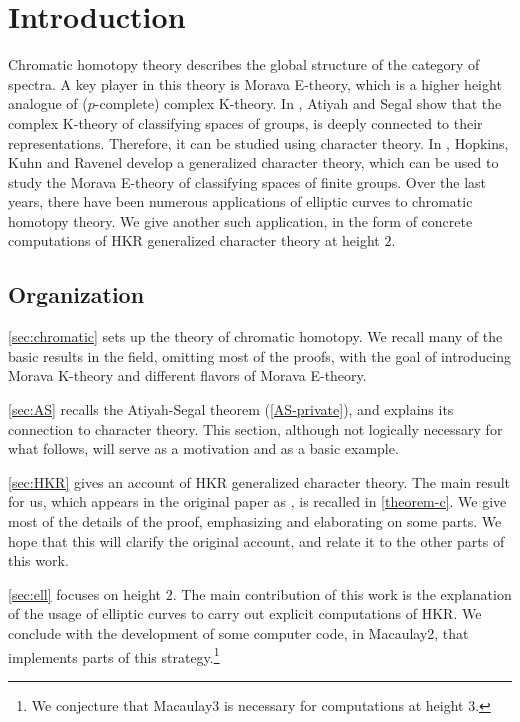 \section{Introduction}

Chromatic homotopy theory describes the global structure of the category of spectra.
A key player in this theory is Morava E-theory, which is a higher height analogue of ($p$-complete) complex K-theory.
In \cite{AS}, Atiyah and Segal show that the complex K-theory of classifying spaces of groups, is deeply connected to their representations. Therefore, it can be studied using character theory.
In \cite{HKR}, Hopkins, Kuhn and Ravenel develop a generalized character theory, which can be used to study the Morava E-theory of classifying spaces of finite groups.
Over the last years, there have been numerous applications of elliptic curves to chromatic homotopy theory.
We give another such application, in the form of concrete computations of HKR generalized character theory at height $2$.



\subsection*{Organization}

\cref{sec:chromatic} sets up the theory of chromatic homotopy.
We recall many of the basic results in the field, omitting most of the proofs, with the goal of introducing Morava K-theory and different flavors of Morava E-theory.

\cref{sec:AS} recalls the Atiyah-Segal theorem (\cref{AS-private}), and explains its connection to character theory.
This section, although not logically necessary for what follows, will serve as a motivation and as a basic example.

\cref{sec:HKR} gives an account of HKR generalized character theory.
The main result for us, which appears in the original paper as \cite[Theorem C]{HKR}, is recalled in \cref{theorem-c}.
We give most of the details of the proof, emphasizing and elaborating on some parts.
We hope that this will clarify the original account, and relate it to the other parts of this work.

\cref{sec:ell} focuses on height $2$.
The main contribution of this work is the explanation of the usage of elliptic curves to carry out explicit computations of HKR.
We conclude with the development of some computer code, in Macaulay2, that implements parts of this strategy.\footnote{We conjecture that Macaulay3 is necessary for computations at height $3$.}



